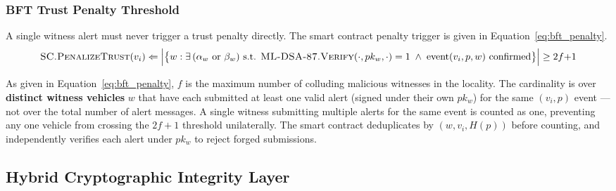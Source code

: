 \documentclass[12pt, a4paper]{report}
\begin{document}
\subsubsection{BFT Trust Penalty Threshold}
A single witness alert must never trigger a trust
penalty directly. The smart contract penalty trigger
is given in Equation~\eqref{eq:bft_penalty}.
\begin{equation}
\textsc{SC.PenalizeTrust}(v_i) \Leftarrow
\Bigl|\bigl\{
w : \exists\,(\alpha_w \text{ or } \beta_w)
\text{ s.t. }
\textsc{ML-DSA-87.Verify}(\cdot,pk_w,\cdot) = 1
\;\land\; \text{event}(v_i,p,w)\text{ confirmed}
\bigr\}\Bigr|
\geq 2f{+}1
\label{eq:bft_penalty}
\end{equation}

As given in Equation~\eqref{eq:bft_penalty}, $f$ is
the maximum number of colluding malicious witnesses
in the locality. The cardinality is over
\textbf{distinct witness vehicles} $w$ that have
each submitted at least one valid alert
(signed under their own $pk_w$) for the same
$(v_i, p)$ event --- not over the total number of
alert messages. A single witness submitting multiple
alerts for the same event is counted as one, preventing
any one vehicle from crossing the $2f{+}1$ threshold
unilaterally. The smart contract deduplicates by
$(w, v_i, H(p))$ before counting, and independently
verifies each alert under $pk_w$ to reject forged
submissions.




\subsection{Hybrid Cryptographic Integrity Layer}
\label{sec:crypto_layer}
\end{document}
